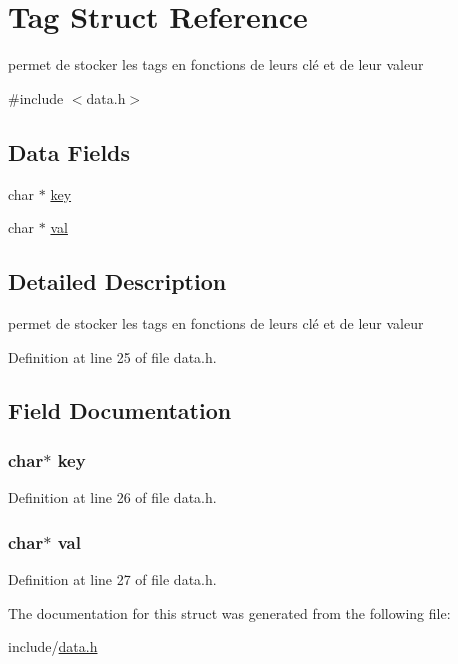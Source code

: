 \hypertarget{struct_tag}{}\section{Tag Struct Reference}
\label{struct_tag}


permet de stocker les tags en fonctions de leurs clé et de leur valeur  




{\ttfamily \#include $<$data.\+h$>$}

\subsection*{Data Fields}
\begin{DoxyCompactItemize}
\item 
char $\ast$ \hyperlink{struct_tag_a5892a9181e6a332f84d27aecd41dcd12}{key}
\item 
char $\ast$ \hyperlink{struct_tag_a1d80a43cb41e5b550d4563dd10d302bc}{val}
\end{DoxyCompactItemize}


\subsection{Detailed Description}
permet de stocker les tags en fonctions de leurs clé et de leur valeur 

Definition at line 25 of file data.\+h.



\subsection{Field Documentation}
\subsubsection[{\texorpdfstring{key}{key}}]{\setlength{\rightskip}{0pt plus 5cm}char$\ast$ key}\hypertarget{struct_tag_a5892a9181e6a332f84d27aecd41dcd12}{}\label{struct_tag_a5892a9181e6a332f84d27aecd41dcd12}


Definition at line 26 of file data.\+h.

\subsubsection[{\texorpdfstring{val}{val}}]{\setlength{\rightskip}{0pt plus 5cm}char$\ast$ val}\hypertarget{struct_tag_a1d80a43cb41e5b550d4563dd10d302bc}{}\label{struct_tag_a1d80a43cb41e5b550d4563dd10d302bc}


Definition at line 27 of file data.\+h.



The documentation for this struct was generated from the following file\+:\begin{DoxyCompactItemize}
\item 
include/\hyperlink{data_8h}{data.\+h}\end{DoxyCompactItemize}

